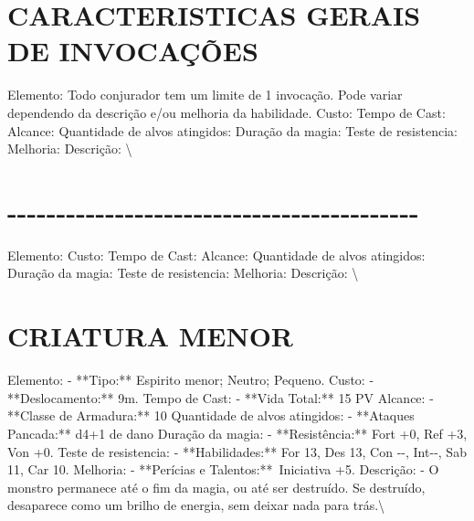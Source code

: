 \documentclass{article}%
\begin{document}
%
\section{CARACTERISTICAS GERAIS DE INVOCAÇÕES}%
\label{sec:CARACTERISTICASGERAISDEINVOCAES}%
Elemento: Todo conjurador tem um limite de 1 invocação. Pode variar dependendo da descrição e/ou melhoria da habilidade.\newline%
Custo: \newline%
Tempo de Cast: \newline%
Alcance: \newline%
Quantidade de alvos atingidos: \newline%
Duração da magia: \newline%
Teste de resistencia: \newline%
Melhoria: \newline%
Descrição: \textbackslash{}

%
\section{{-}{-}{-}{-}{-}{-}{-}{-}{-}{-}{-}{-}{-}{-}{-}{-}{-}{-}{-}{-}{-}{-}{-}{-}{-}{-}{-}{-}{-}{-}{-}{-}{-}{-}{-}{-}{-}{-}{-}{-}{-}{-}}%
\label{sec:{-}{-}{-}{-}{-}{-}{-}{-}{-}{-}{-}{-}{-}{-}{-}{-}{-}{-}{-}{-}{-}{-}{-}{-}{-}{-}{-}{-}{-}{-}{-}{-}{-}{-}{-}{-}{-}{-}{-}{-}{-}{-}}%
Elemento: \newline%
Custo: \newline%
Tempo de Cast: \newline%
Alcance: \newline%
Quantidade de alvos atingidos: \newline%
Duração da magia: \newline%
Teste de resistencia: \newline%
Melhoria: \newline%
Descrição: \textbackslash{}

%
\section{CRIATURA MENOR}%
\label{sec:CRIATURAMENOR}%
Elemento: {-} **Tipo:** Espirito menor; Neutro; Pequeno.\newline%
Custo: {-} **Deslocamento:** 9m.\newline%
Tempo de Cast: {-} **Vida Total:** 15 PV\newline%
Alcance: {-} **Classe de Armadura:** 10\newline%
Quantidade de alvos atingidos: {-} **Ataques Pancada:** d4+1 de dano\newline%
Duração da magia: {-} **Resistência:** Fort +0, Ref +3, Von +0.\newline%
Teste de resistencia: {-} **Habilidades:** For 13, Des 13, Con {-}{-}, Int{-}{-}, Sab 11, Car 10.\newline%
Melhoria: {-} **Perícias e Talentos:**~Iniciativa +5.\newline%
Descrição: {-} O monstro permanece até o fim da magia, ou até ser destruído. Se destruído, desaparece como um brilho de energia, sem deixar nada para trás.\textbackslash{}
\end{document}
